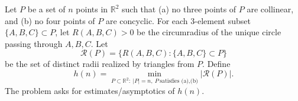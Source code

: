 Let $P$ be a set of $n$ points in $\mathbb{R}^2$ such that
(a) no three points of $P$ are collinear, and
(b) no four points of $P$ are concyclic.
For each 3-element subset $\{A,B,C\}\subset P$, let $R(A,B,C)>0$ be the circumradius of the unique circle passing through $A,B,C$.
Let
\[
\mathcal{R}(P)=\{R(A,B,C): \{A,B,C\}\subset P\}
\]
be the set of distinct radii realized by triangles from $P$.
Define
\[
 h(n)=\min_{P\subset\mathbb{R}^2:\ |P|=n,\ P\ \text{satisfies (a),(b)}} |\mathcal{R}(P)|.
\]
The problem asks for estimates/asymptotics of $h(n)$.
